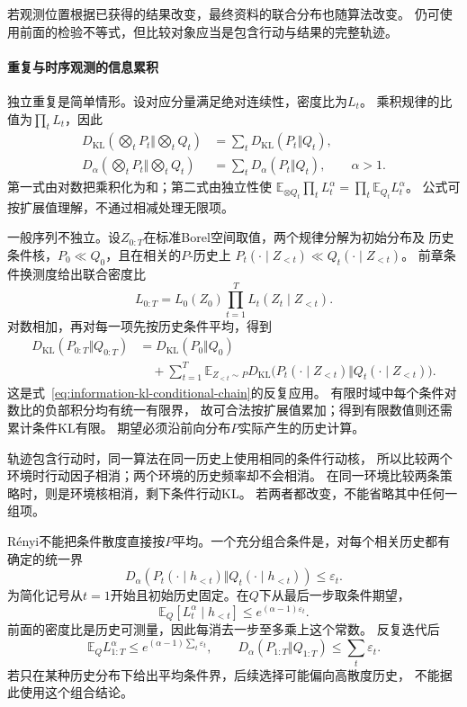若观测位置根据已获得的结果改变，最终资料的联合分布也随算法改变。
仍可使用前面的检验不等式，但比较对象应当是包含行动与结果的完整轨迹。

\paragraph{重复与时序观测的信息累积}
\label{sec:information-sequential-accumulation}

独立重复是简单情形。设对应分量满足绝对连续性，密度比为\(L_t\)。
乘积规律的比值为\(\prod_tL_t\)，因此
\[
\begin{aligned}
  D_{\mathrm{KL}}\left(\bigotimes_tP_t\Big\Vert\bigotimes_tQ_t\right)
     &=\sum_tD_{\mathrm{KL}}(P_t\Vert Q_t),\\
  D_\alpha\left(\bigotimes_tP_t\Big\Vert\bigotimes_tQ_t\right)
     &=\sum_tD_\alpha(P_t\Vert Q_t),\qquad\alpha>1.
\end{aligned}
\]
第一式由对数把乘积化为和；第二式由独立性使
\(\mathbb E_{\otimes Q_t}\prod_tL_t^\alpha=\prod_t\mathbb E_{Q_t}L_t^\alpha\)。
公式可按扩展值理解，不通过相减处理无限项。

一般序列不独立。设\(Z_{0:T}\)在标准Borel空间取值，两个规律分解为初始分布及
历史条件核，\(P_0\ll Q_0\)，且在相关的\(P\)-历史上
\(P_t(\cdot\mid Z_{<t})\ll Q_t(\cdot\mid Z_{<t})\)。
前章条件换测度给出联合密度比
\[
  L_{0:T}=L_0(Z_0)\prod_{t=1}^T L_t(Z_t\mid Z_{<t}).
\]
对数相加，再对每一项先按历史条件平均，得到
\begin{equation}
\begin{aligned}
 D_{\mathrm{KL}}(P_{0:T}\Vert Q_{0:T})
 &=D_{\mathrm{KL}}(P_0\Vert Q_0)\\
 &\quad+\sum_{t=1}^T\mathbb E_{Z_{<t}\sim P}
 D_{\mathrm{KL}}\bigl(P_t(\cdot\mid Z_{<t})
                     \Vert Q_t(\cdot\mid Z_{<t})\bigr).
\end{aligned}
\label{eq:information-trajectory-kl-chain}
\end{equation}
这是式~\eqref{eq:information-kl-conditional-chain}的反复应用。
有限时域中每个条件对数比的负部积分均有统一有限界，
故可合法按扩展值累加；得到有限数值则还需累计条件KL有限。
期望必须沿前向分布\(P\)实际产生的历史计算。

轨迹包含行动时，同一算法在同一历史上使用相同的条件行动核，
所以比较两个环境时行动因子相消；两个环境的历史频率却不会相消。
在同一环境比较两条策略时，则是环境核相消，剩下条件行动KL。
若两者都改变，不能省略其中任何一组项。

Rényi不能把条件散度直接按\(P\)平均。一个充分组合条件是，对每个相关历史都有
确定的统一界
\[
  D_\alpha(P_t(\cdot\mid h_{<t})\Vert Q_t(\cdot\mid h_{<t}))
  \leq\varepsilon_t.
\]
为简化记号从\(t=1\)开始且初始历史固定。在\(Q\)下从最后一步取条件期望，
\[
  \mathbb E_Q[L_t^\alpha\mid h_{<t}]
       \leq e^{(\alpha-1)\varepsilon_t}.
\]
前面的密度比是历史可测量，因此每消去一步至多乘上这个常数。
反复迭代后
\[
  \mathbb E_Q L_{1:T}^{\alpha}
  \leq e^{(\alpha-1)\sum_t\varepsilon_t},\qquad
  D_\alpha(P_{1:T}\Vert Q_{1:T})\leq\sum_t\varepsilon_t.
\]
若只在某种历史分布下给出平均条件界，后续选择可能偏向高散度历史，
不能据此使用这个组合结论。

